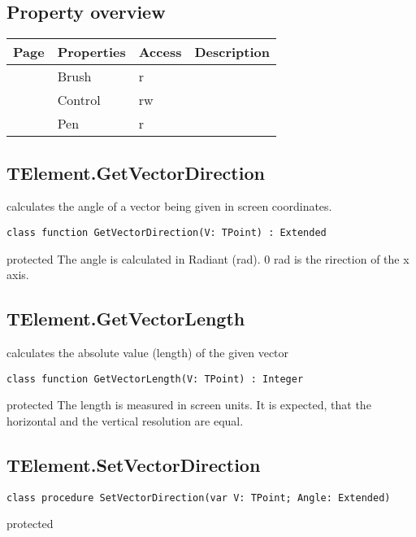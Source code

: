 \subsection{Property overview}
\label{hmi:drawncontrol:telement:properties}
\begin{tabularx}{\textwidth}{lllX}
Page & Properties & Access & Description \\ \hline
\pageref{hmi:drawncontrol:telement:brush} & Brush & r &  \\
\pageref{hmi:drawncontrol:telement:control} & Control & rw &  \\
\pageref{hmi:drawncontrol:telement:pen} & Pen & r &  \\
\hline
\end{tabularx}
\subsection{TElement.GetVectorDirection}
\label{hmi:drawncontrol:telement:getvectordirection}
\begin{FPCList}
\Synopsis
calculates the angle of a vector being given in screen coordinates. \Declaration 

\begin{verbatim}
class function GetVectorDirection(V: TPoint) : Extended
\end{verbatim}
\Visibility
protected
\Description
The angle is calculated in Radiant (rad). 0 rad is the rirection of the x axis. \end{FPCList}
\subsection{TElement.GetVectorLength}
\label{hmi:drawncontrol:telement:getvectorlength}
\begin{FPCList}
\Synopsis
calculates the absolute value (length) of the given vector\Declaration 

\begin{verbatim}
class function GetVectorLength(V: TPoint) : Integer
\end{verbatim}
\Visibility
protected
\Description
The length is measured in screen units. It is expected, that the horizontal and the vertical resolution are equal. \end{FPCList}
\subsection{TElement.SetVectorDirection}
\label{hmi:drawncontrol:telement:setvectordirection}
\begin{FPCList}
\Declaration 

\begin{verbatim}
class procedure SetVectorDirection(var V: TPoint; Angle: Extended)
\end{verbatim}
\Visibility
protected
\end{FPCList}
